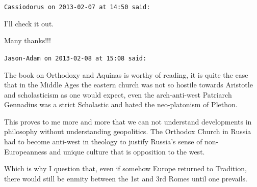 \begin{footnotesize}
\begin{sffamily}
\hfill

\texttt{Cassiodorus on 2013-02-07 at 14:50 said:}

I'll check it out.

Many thanks!!!

\hfill

\texttt{Jason-Adam on 2013-02-08 at 15:08 said:}

The book on Orthodoxy and Aquinas is worthy of reading, it is quite the case that in the Middle Ages the eastern church was not so hostile towards Aristotle and scholasticism as one would expect, even the arch-anti-west Patriarch Gennadius was a strict Scholastic and hated the neo-platonism of Plethon.

This proves to me more and more that we can not understand developments in philosophy without understanding geopolitics. The Orthodox Church in Russia had to become anti-west in theology to justify Russia's sense of non-Europeanness and unique culture that is opposition to the west.

Which is why I question that, even if somehow Europe returned to Tradition, there would still be enmity between the 1st and 3rd Romes until one prevails.


\hfill

\end{sffamily}
\end{footnotesize}

